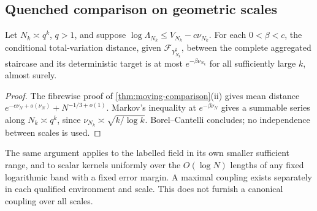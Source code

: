 \subsection{Quenched comparison on geometric scales}
\begin{corollary}\label{cor:quenched}
Let $N_k\asymp q^k$, $q>1$, and suppose
$\log\Lambda_{N_k}\le V_{N_k}-c\nu_{N_k}$.
For each $0<\beta<c$, the conditional total-variation distance, given
$\mathcal F_{Y_{N_k}^\sharp}$, between the complete aggregated staircase
and its deterministic target is at most $e^{-\beta\nu_{N_k}}$ for all
sufficiently large $k$, almost surely.
\end{corollary}
\begin{proof}
The fibrewise proof of \cref{thm:moving-comparison}(ii) gives mean distance
$e^{-c\nu_N+o(\nu_N)}+N^{-1/3+o(1)}$.
Markov's inequality at $e^{-\beta\nu_N}$ gives a summable series along
$N_k\asymp q^k$, since $\nu_{N_k}\asymp\sqrt{k/\log k}$.
Borel--Cantelli concludes; no independence between scales is used.
\end{proof}
The same argument applies to the labelled field in its own smaller
sufficient range, and to scalar kernels uniformly over the $O(\log N)$
lengths of any fixed logarithmic band with a fixed error margin.
A maximal coupling exists separately in each qualified environment and
scale. This does not furnish a canonical coupling over all scales.
